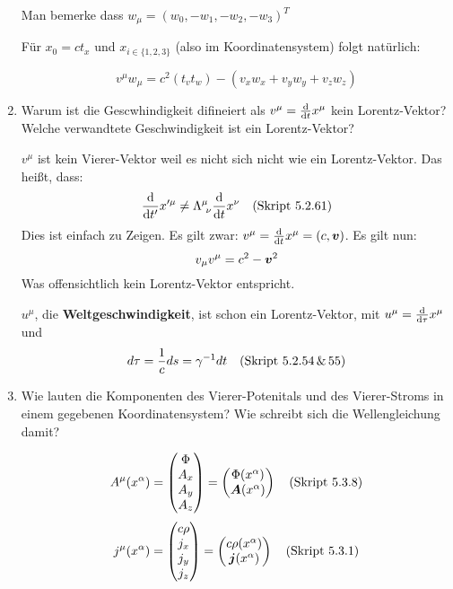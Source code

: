 \begin{enumerate}
    Man bemerke dass $w_\mu=(w_0, -w_1, -w_2, -w_3)^T$

    Für $x_0=ct_x$ und $x_{i\in\{1,2,3\}}$ (also im Koordinatensystem) 
    folgt natürlich:

    \begin{equation*}
      v^\mu w_\mu = c^2(t_vt_w) - (v_xw_x + v_yw_y + v_zw_z)
    \end{equation*}

  \item Warum ist die Gescwhindigkeit difineiert als $v^\mu=\dv t x^\mu$ %
    kein Lorentz-Vektor? Welche verwandtete Geschwindigkeit ist ein
    Lorentz-Vektor?

    $v^\mu$ ist kein Vierer-Vektor weil es nicht sich nicht
    wie ein Lorentz-Vektor. Das heißt, dass:
    \begin{equation*}
      \dv {t'} x'^\mu \neq \Lambda^{\mu}_{\ \nu}\dv t x^\nu
      \quad\text{(Skript 5.2.61)}
    \end{equation*}
    Dies ist einfach zu Zeigen. Es gilt zwar: 
    $v^\mu=\dv t x^\mu=(c,\vb* v)$. Es gilt nun:
    \begin{equation*}
      v_\mu v^\mu = c^2-\vb* v^2
    \end{equation*}
    Was offensichtlich kein Lorentz-Vektor entspricht.

    $u^\mu$, die \textbf{Weltgeschwindigkeit}, 
    ist schon ein Lorentz-Vektor,
    mit $u^\mu=\dv \tau x^\mu$ und
    $$d\tau=\frac{1}{c}ds=\gamma^{-1}dt \quad\text{(Skript 5.2.54\,\&\,55)}$$

  \item Wie lauten die Komponenten des Vierer-Potenitals und des %
    Vierer-Stroms in einem gegebenen Koordinatensystem? Wie schreibt
    sich die Wellengleichung damit?

    \begin{equation*}
      A^\mu(x^\alpha)=
      \begin{pmatrix}
        \Phi\\ A_x\\ A_y\\ A_z
      \end{pmatrix}
      =
      \begin{pmatrix}
        \Phi(x^\alpha) \\ \vb* A(x^\alpha)
      \end{pmatrix}
      \quad\text{(Skript 5.3.8)}
    \end{equation*}
    \begin{equation*}
      j^\mu(x^\alpha) =
      \begin{pmatrix}
        c\rho\\ j_x\\ j_y\\ j_z
      \end{pmatrix}
      =
      \begin{pmatrix}
        c\rho(x^\alpha) \\ \vb* j(x^\alpha)
      \end{pmatrix}
      \quad\text{(Skript 5.3.1)}
    \end{equation*}


\end{enumerate}
